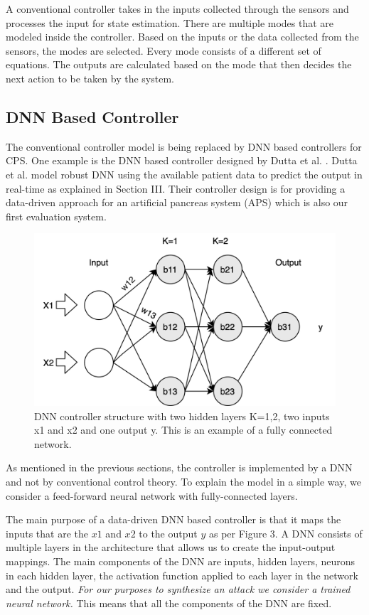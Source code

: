 A conventional controller takes in the inputs collected through the sensors and processes the input for state estimation. There are multiple modes that are modeled inside the controller. Based on the inputs or the data collected from the sensors, the modes are selected. Every mode consists of a different set of equations.  The outputs are calculated based on the mode that then decides the next action to be taken by the system. 
\fi


\subsection{DNN Based Controller}
The conventional controller model is being replaced by DNN based controllers for CPS. One example is the DNN based controller designed by Dutta et al. \cite{Dutta_Others__2018__Robust}. Dutta et al. model robust DNN using the available patient data to predict the output in real-time as explained in Section III. Their controller design is for providing a data-driven approach for an artificial pancreas system (APS) which is also our first evaluation system.
\begin{figure}
	\centering
	\includegraphics[width=0.7\linewidth]{Images/DNNstructure}
	\caption[DNN structure]{DNN controller structure with two hidden layers K=1,2, two inputs x1 and x2 and one output y. This is an example of a fully connected network.}
	\label{fig:dnn-controller}
\end{figure}

As mentioned in the previous sections, the controller is implemented by a DNN and not by conventional control theory. To explain the model in a simple way, we consider a feed-forward neural network with fully-connected layers. %

The main purpose of a data-driven DNN based controller is that it maps the inputs that are the $x1$ and $x2$ to the output $y$ as per Figure 3. A DNN consists of multiple layers in the architecture that allows us to create the input-output mappings. The main components of the DNN are inputs, hidden layers, neurons in each hidden layer, the activation function applied to each layer in the network and the output. \textit{For our purposes to synthesize an attack we consider a trained neural network.} This means that all the components of the DNN are fixed.


